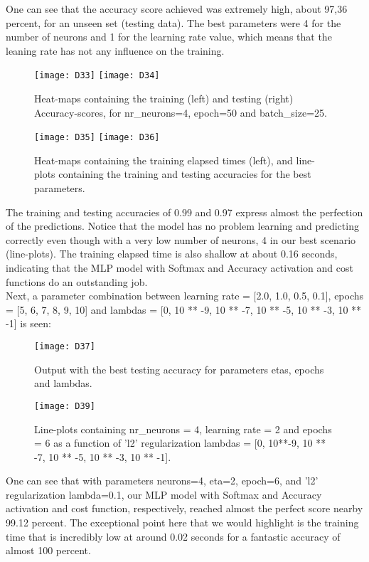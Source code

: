 One can see that the accuracy score achieved was extremely high, about 97,36 percent, for an unseen set (testing data). The best parameters were 4 for the number of neurons and 1 for the learning rate value, which means that the leaning rate has not any influence on the training.

\begin{figure}[H]
\label{fig:D21}
\centering
\texttt{[image: D33]}
\texttt{[image: D34]}
\caption{Heat-maps containing the training (left) and testing (right) Accuracy-scores, for nr\_neurons=4, epoch=50 and batch\_size=25.}
\end{figure}

\begin{figure}[H]
\label{fig:D22}
\centering
\texttt{[image: D35]}
\texttt{[image: D36]}
\caption{Heat-maps containing the training elapsed times (left), and line-plots containing the training and testing accuracies for the best parameters.}
\end{figure}

The training and testing accuracies of 0.99 and 0.97 express almost the perfection of the predictions. Notice that the model has no problem learning and predicting correctly even though with a very low number of neurons, 4 in our best scenario (line-plots). The training elapsed time is also shallow at about 0.16 seconds, indicating that the MLP model with Softmax and Accuracy activation and cost functions do an outstanding job.\\

Next, a parameter combination between learning rate = [2.0, 1.0, 0.5, 0.1], epochs = [5, 6, 7, 8, 9, 10] and lambdas = [0, 10 ** -9, 10 ** -7, 10 ** -5, 10 ** -3, 10 ** -1] is seen:

\begin{figure}[H]
\label{fig:D23}
\centering
\texttt{[image: D37]}
\caption{Output with the best testing accuracy for parameters etas, epochs and lambdas.}
\end{figure}

\begin{figure}[H]
\label{fig:D24}
\centering
\texttt{[image: D39]}
\caption{Line-plots containing nr\_neurons = 4, learning rate = 2 and epochs = 6 as a function of 'l2' regularization lambdas = [0, 10**-9, 10 ** -7, 10 ** -5, 10 ** -3, 10 ** -1].}
\end{figure}

One can see that with parameters neurons=4, eta=2, epoch=6, and 'l2' regularization lambda=0.1, our MLP model with Softmax and Accuracy activation and cost function, respectively, reached almost the perfect score nearby 99.12 percent. The exceptional point here that we would highlight is the training time that is incredibly low at around 0.02 seconds for a fantastic accuracy of almost 100 percent.\\


